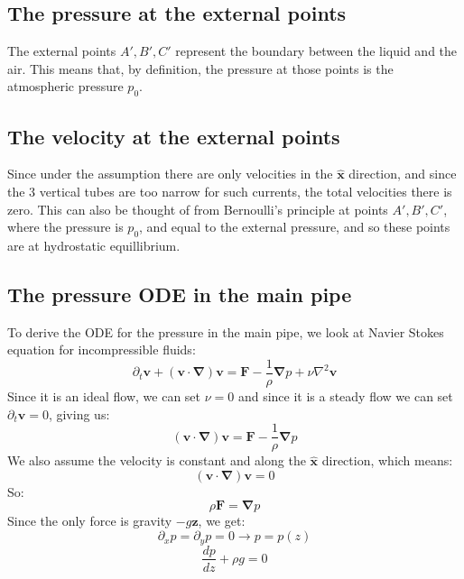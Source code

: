 \documentclass{article}
\begin{document}
\subsection{The pressure at the external points}
The external points $A', B', C'$ represent the boundary between the liquid and the air. This means that, by definition, the pressure at those points is the atmospheric pressure $p_0$.
\subsection{The velocity at the external points}
Since under the assumption there are only velocities in the $\boldsymbol{\hat{x}}$ direction, and since the 3 vertical tubes are too narrow for such currents, the total velocities there is zero. This can also be thought of from Bernoulli's principle at points $A', B', C'$, where the pressure is $p_0$, and equal to the external pressure, and so these points are at hydrostatic equillibrium.
\subsection{The pressure ODE in the main pipe}
To derive the ODE for the pressure in the main pipe, we look at Navier Stokes equation for incompressible fluids:
\begin{equation}
    \partial_t \boldsymbol{v} + (\boldsymbol{v}\cdot\boldsymbol{\nabla})\boldsymbol{v} = \boldsymbol{F} - \frac{1}{\rho}\boldsymbol{\nabla}p + \nu \nabla^2 \boldsymbol{v}
\end{equation}
Since it is an ideal flow, we can set $\nu = 0$ and since it is a steady flow we can set $\partial_t \boldsymbol{v} = 0$, giving us:
\begin{equation}
    (\boldsymbol{v}\cdot\boldsymbol{\nabla})\boldsymbol{v} = \boldsymbol{F} - \frac{1}{\rho}\boldsymbol{\nabla}p
\end{equation}
We also assume the velocity is constant and along the $\boldsymbol{\hat{x}}$ direction, which means:
\begin{equation}
    (\boldsymbol{v}\cdot\boldsymbol{\nabla})\boldsymbol{v} = 0
\end{equation}
So:
\begin{equation}
    \rho \boldsymbol{F} = \boldsymbol{\nabla}p
\end{equation}
Since the only force is gravity $-g \boldsymbol{\hat{z}}$, we get:
\begin{equation}
    \partial_x p = \partial_y p = 0 \rightarrow p = p(z)
\end{equation}
\begin{equation}
    \boxed{\frac{dp}{dz} + \rho g = 0}
\end{equation}
\end{document}
